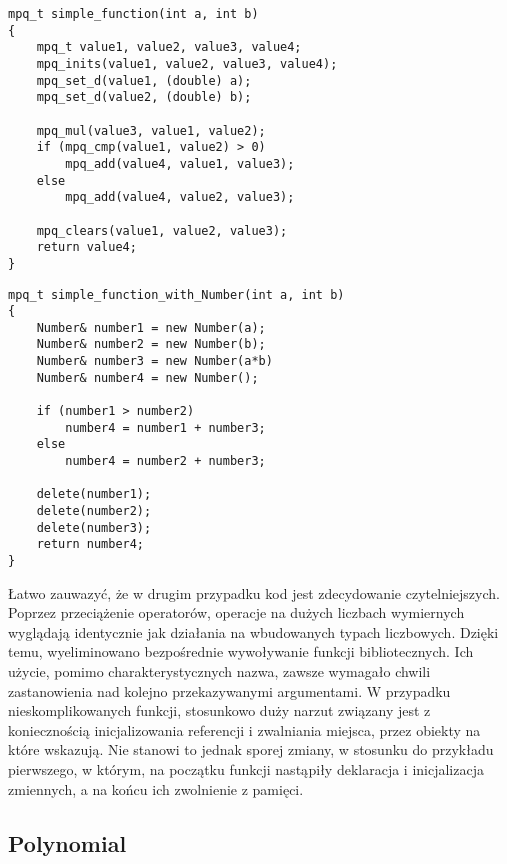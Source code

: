 \documentclass[twoside,a4paper]{book}
\begin{document}
\begin{lstlisting}
mpq_t simple_function(int a, int b)
{
	mpq_t value1, value2, value3, value4;
	mpq_inits(value1, value2, value3, value4);
	mpq_set_d(value1, (double) a);
	mpq_set_d(value2, (double) b);

	mpq_mul(value3, value1, value2);
	if (mpq_cmp(value1, value2) > 0)
		mpq_add(value4, value1, value3);
	else
		mpq_add(value4, value2, value3);

	mpq_clears(value1, value2, value3);
	return value4;
}
\end{lstlisting}

\begin{lstlisting}
mpq_t simple_function_with_Number(int a, int b)
{
	Number& number1 = new Number(a);
	Number& number2 = new Number(b);
	Number& number3 = new Number(a*b)
	Number& number4 = new Number();

	if (number1 > number2)
		number4 = number1 + number3;
	else
		number4 = number2 + number3;

	delete(number1);
	delete(number2);
	delete(number3);
	return number4;
}
\end{lstlisting}

Łatwo zauwazyć, że w drugim przypadku kod jest zdecydowanie czytelniejszych. Poprzez przeciążenie operatorów, operacje na dużych liczbach wymiernych wyglądają identycznie jak działania na wbudowanych typach liczbowych. Dzięki temu, wyeliminowano bezpośrednie wywoływanie funkcji bibliotecznych. Ich użycie, pomimo charakterystycznych nazwa, zawsze wymagało chwili zastanowienia nad kolejno przekazywanymi argumentami. W przypadku nieskomplikowanych funkcji, stosunkowo duży narzut związany jest z koniecznością inicjalizowania referencji i zwalniania miejsca, przez obiekty na które wskazują. Nie stanowi to jednak sporej zmiany, w stosunku do przykładu pierwszego, w którym, na początku funkcji nastąpiły deklaracja i inicjalizacja zmiennych, a na końcu ich zwolnienie z pamięci.

\subsection{Polynomial}
\end{document}
